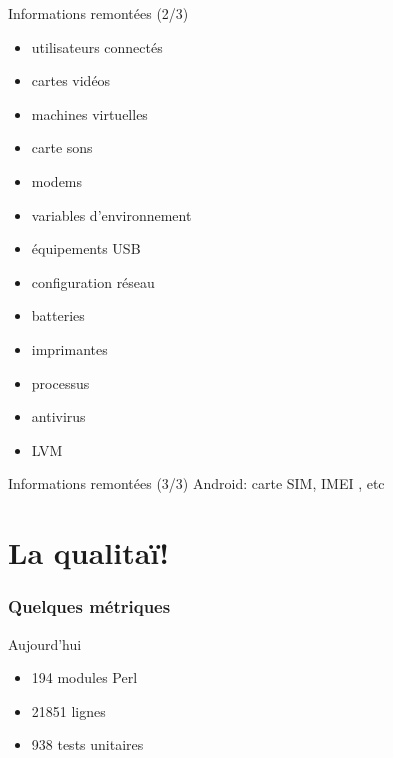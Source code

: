 \documentclass{beamer}
\begin{document}
\begin{frame}
    \begin{block}{Informations remontées (2/3)}
        \begin{itemize}
        \item utilisateurs connectés
        \item cartes vidéos
        \item machines virtuelles
        \item carte sons
        \item modems
        \item variables d'environnement
        \item équipements USB
        \item configuration réseau
        \item batteries
        \item imprimantes
        \item processus
        \item antivirus
        \item LVM
        \end{itemize}
    \end{block}
\end{frame}

\begin{frame}
    \begin{block}{Informations remontées (3/3)}
        Android: carte SIM, IMEI , etc
    \end{block}
\end{frame}

\section{La qualitaï!}

\begin{frame}
    \frametitle{Quelques métriques}

    \begin{block}{Aujourd'hui}
        \begin{itemize}
            \item 194 modules Perl
            \item 21851 lignes
            \item 938 tests unitaires
        \end{itemize}
    \end{block}

\end{frame}
\end{document}
